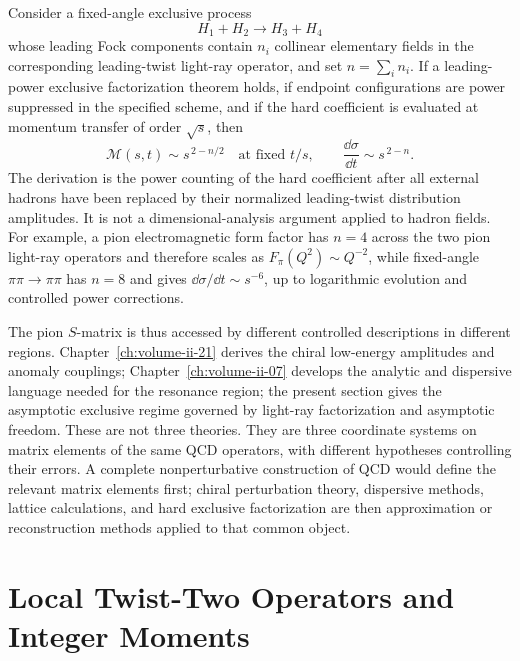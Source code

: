 \begin{controlledapproximation}
\label{ca:qcd-brodsky-farrar-scaling-status}
Consider a fixed-angle exclusive process
\[
  H_1+H_2\longrightarrow H_3+H_4
\]
whose leading Fock components contain \(n_i\) collinear elementary fields in
the corresponding leading-twist light-ray operator, and set
\(n=\sum_i n_i\).  If a leading-power exclusive factorization theorem holds,
if endpoint configurations are power suppressed in the specified scheme, and
if the hard coefficient is evaluated at momentum transfer of order
\(\sqrt s\), then
\begin{equation}
  \mathcal M(s,t)\sim s^{\,2-n/2}
  \quad\text{at fixed }t/s,
  \qquad
  \frac{\dd\sigma}{\dd t}\sim s^{\,2-n}.
  \label{eq:qcd-brodsky-farrar-counting}
\end{equation}
The derivation is the power counting of the hard coefficient after all
external hadrons have been replaced by their normalized leading-twist
distribution amplitudes.  It is not a dimensional-analysis argument applied to
hadron fields.  For example, a pion electromagnetic form factor has
\(n=4\) across the two pion light-ray operators and therefore scales as
\(F_\pi(Q^2)\sim Q^{-2}\), while fixed-angle
\(\pi\pi\to\pi\pi\) has \(n=8\) and gives
\(\dd\sigma/\dd t\sim s^{-6}\), up to logarithmic evolution and controlled
power corrections.
\end{controlledapproximation}

The pion \(S\)-matrix is thus accessed by different controlled descriptions in
different regions.  Chapter~\ref{ch:volume-ii-21} derives the chiral
low-energy amplitudes and anomaly couplings; Chapter~\ref{ch:volume-ii-07}
develops the analytic and dispersive language needed for the resonance
region; the present section gives the asymptotic exclusive regime governed by
light-ray factorization and asymptotic freedom.  These are not three theories.
They are three coordinate systems on matrix elements of the same QCD
operators, with different hypotheses controlling their errors.  A complete
nonperturbative construction of QCD would define the relevant matrix elements
first; chiral perturbation theory, dispersive methods, lattice calculations,
and hard exclusive factorization are then approximation or reconstruction
methods applied to that common object.

\section{Local Twist-Two Operators and Integer Moments}

